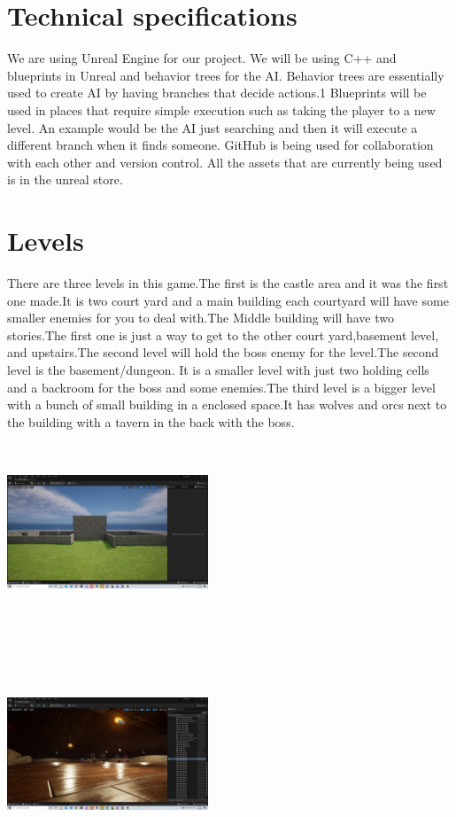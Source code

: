 \documentclass{sigchi}
\begin{document}
\section{Technical specifications}
We are using Unreal Engine for our project. We will be using C++ and blueprints in Unreal and behavior trees for the AI. Behavior trees are essentially used to create AI by having branches that decide actions.1 Blueprints will be used in places that require simple execution such as taking the player to a new level. An example would be the AI just searching and then it will execute a different branch when it finds someone. GitHub is being used for collaboration with each other and version control. All the assets that are currently being used is in the unreal store. 
\section{Levels}
There are three levels in this game.The first is the castle area and it was the first one made.It is two court yard and a main building each courtyard will have some smaller enemies for you to deal with.The Middle building will have two stories.The first one is just a way to get to the other court yard,basement level, and upstairs.The second level will hold the boss enemy for the level.The second level is the basement/dungeon. It is a smaller level with just two holding cells and a backroom for the boss and some enemies.The third level is a bigger level with a bunch of small building in a enclosed space.It has wolves and orcs next to the building with a tavern in the back with the boss. \\
\includegraphics[width=6cm, height=6cm]{Figure/castle.png}\\ \\  
\includegraphics[width=6cm, height=6cm]{Figure/basement.png}\\ \\  
\end{document}
